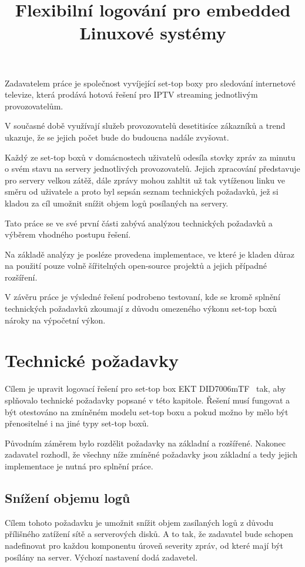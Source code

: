 \documentclass[thesis=B,czech]{FITthesis}[2012/06/26]
\title{Flexibilní logování pro embedded Linuxové systémy}
\begin{document}
\begin{introduction}
Zadavatelem práce je společnost vyvíjející set-top boxy pro sledování internetové televize, která prodává hotová řešení pro IPTV streaming jednotlivým provozovatelům.

V současné době využívají služeb provozovatelů desetitisíce zákazníků a trend ukazuje, že se jejich počet bude do budoucna nadále zvyšovat.

Každý ze set-top boxů v domácnostech uživatelů odesíla stovky zpráv za minutu o svém stavu na servery jednotlivých provozovatelů. Jejich zpracování představuje pro servery velkou zátěž, dále zprávy mohou zahltit už tak vytíženou linku ve směru od uživatele a proto byl sepsán seznam technických požadavků, jež si kladou za cíl umožnit snížit objem logů posílaných na servery.

Tato práce se ve své první části zabývá analýzou technických požadavků a výběrem vhodného postupu řešení.
 
Na základě analýzy je posléze provedena implementace, ve které je kladen důraz na použití pouze volně šířitelných open-source projektů a jejich případné rozšíření.
 
V závěru práce je výsledné řešení podrobeno testovaní, kde se kromě splnění technických požadavků zkoumají z důvodu omezeného výkonu set-top boxů nároky na výpočetní výkon.
\end{introduction}

\chapter{Technické požadavky}
Cílem je upravit logovací řešení pro set-top box EKT DID7006mTF~\cite{ekt7006} tak, aby splňovalo technické požadavky popsané v této kapitole. Řešení musí fungovat a být otestováno na zmíněném modelu set-top boxu a pokud možno by mělo být přenositelné i na jiné typy set-top boxů.

Původním záměrem bylo rozdělit požadavky na základní a rozšířené. Nakonec zadavatel rozhodl, že všechny níže zmíněné požadavky jsou základní a tedy jejich implementace je nutná pro splnění práce.

\section*{Snížení objemu logů}
Cílem tohoto požadavku je umožnit snížit objem zasílaných logů z důvodu přílišného zatížení sítě a serverových disků. A to tak, že zadavatel bude schopen nadefinovat pro každou komponentu úroveň severity zpráv, od které mají být posílány na server. Výchozí nastavení dodá zadavetel.
\end{document}
